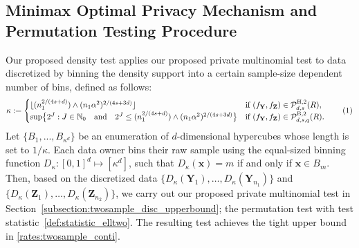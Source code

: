 \documentclass[twoside,11pt]{article}
\newcommand\numberthis{\addtocounter{equation}{1}\tag{\theequation}}
\newcommand{\distClassGeneric}{\mathcal{P}}
\newcommand{\rvTwo}{Y}
\newcommand{\rvThree}{Z}
\newcommand{\vectorize}[1]{\mathbf{#1}}
\newcommand{\dimDensity}{d} %
\newcommand{\vectorIndex}{m}
\newcommand{\sampleSize}{n}
\newcommand{\smoothness}{s}
\newcommand{\binner}{D} 	  %
\newcommand{\ballRadius}{R}
\newcommand{\privacyParameter}{\alpha} %
\newcommand{\binNum}{\kappa}           %
\newcommand{\besovParamMicroscope}{q}
\newcommand{\primResLev}{J}
\newcommand{\domainTs}{
	[0,1]^{{\dimDensity}}
}
\newcommand{\pBesovTs}{ %
	\distClassGeneric_{%
		\dimDensity, \smoothness, \besovParamMicroscope
	}^{%
		\mathrm{B,2}
	}
	(\ballRadius)
}
\newcommand{\pHolderTs}{ %
	\distClassGeneric_{%
		\dimDensity, \smoothness
	}^{%
		\mathrm{H,2}
	}
	(\ballRadius)
}
\begin{document}
\subsection{Minimax Optimal Privacy Mechanism and Permutation Testing Procedure}\label{subsection:twosample_conti_upperbound}
Our proposed density test applies our proposed private multinomial test to data discretized by binning the density support into a certain sample-size dependent number of bins, defined as follows: 
\begin{align*}
	\binNum 
	:=
	\begin{cases}
		\lfloor
		(\sampleSize_1^{2/(4\smoothness+\dimDensity)})
		\wedge
		(\sampleSize_1 \privacyParameter^2)^{2/(4\smoothness+3\dimDensity)}
		\rfloor
		& \text{if}~(f_{\vectorize{\rvTwo}}, f_{\vectorize{\rvThree}}) \in \pHolderTs,
		\\
		\sup 
		\bigl\{
		2^\primResLev
		: \primResLev \in \mathbb{N}_0
		\quad \text{and} \quad
		2^\primResLev
		\leq
		(\sampleSize_1^{2/(4\smoothness+\dimDensity)})
		\wedge
		(\sampleSize_1 \privacyParameter^2)^{2/(4\smoothness+3\dimDensity)}
		\bigr\}
		& \text{if}~(f_{\vectorize{\rvTwo}}, f_{\vectorize{\rvThree}}) \in \pBesovTs.
	\end{cases}
	\numberthis \label{eq:kappaValueTwosample}
\end{align*}
Let $\{B_1,...,B_{ \binNum^{\dimDensity}} \}$ be an enumeration of $\dimDensity$-dimensional hypercubes whose length is set to $1/\binNum$.
Each data owner bins their raw sample using the equal-sized binning function $\binner_{\binNum} : \domainTs \mapsto [\binNum^\dimDensity]$, such that $\binner_{\binNum}(\vectorize{x}) = \vectorIndex$ if and only if $\vectorize{x} \in B_\vectorIndex$.
Then, based on the discretized data $\{\binner_{\binNum}(\mathbf{Y}_1), \dots, \binner_{\binNum}(\mathbf{Y}_{n_1})\}$ and $\{\binner_{\binNum}(\mathbf{Z}_1), \dots, \binner_{\binNum}(\mathbf{Z}_{n_2})\}$, we carry out our proposed private multinomial test in Section~\ref{subsection:twosample_disc_upperbound}; the permutation test with test statistic~\eqref{def:statistic_elltwo}. The resulting test achieves the tight upper bound in \eqref{rates:twosample_conti}.
\end{document}
